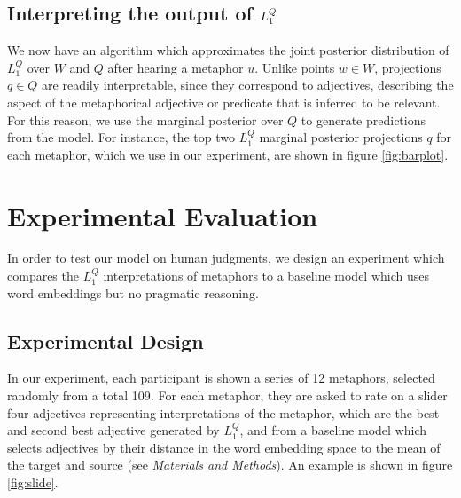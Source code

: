 \documentclass[9pt,twocolumn,twoside,lineno]{pnas-new}
\newcommand{\Listener}{L}
\newcommand{\QLONE}{\Listener_{{1}}^{{Q}}}
\begin{document}
\subsection{Interpreting the output of $\protect\QLONE$}

	We now have an algorithm which approximates the joint posterior distribution of $\QLONE$ over $W$ and $Q$ after hearing a metaphor $u$. Unlike points $w\in W$, projections $q\in Q$ are readily interpretable, since they correspond to adjectives, describing the aspect of the metaphorical adjective or predicate that is inferred to be relevant.
	For this reason, we use the marginal posterior over $Q$ to generate predictions from the model. For instance, the top two $\QLONE$ marginal posterior projections $q$ for each metaphor, which we use in our experiment, are shown in figure \ref{fig:barplot}. 





\section{Experimental Evaluation} \label{exp}

	In order to test our model on human judgments, we design an experiment which compares the $\QLONE$ interpretations of metaphors to a baseline model which uses word embeddings but no pragmatic reasoning.


	\subsection*{Experimental Design}

		In our experiment, each participant is shown a series of 12 metaphors, selected randomly from a total 109. For each metaphor, they are asked to rate on a slider four adjectives representing interpretations of the metaphor, which are the best and second best adjective generated by $\QLONE$, and from a baseline model which selects adjectives by their distance in the word embedding space to the mean of the target and source (see \emph{Materials and Methods}). An example is shown in figure \ref{fig:slide}.
\end{document}
